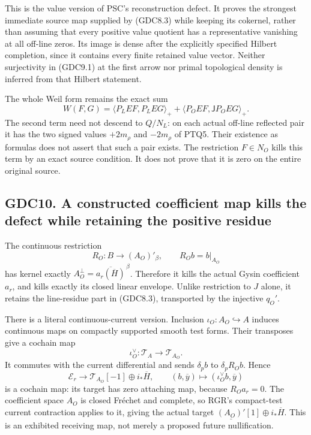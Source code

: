 This is the value version of PSC's reconstruction defect. It proves the
strongest immediate source map supplied by (GDC8.3) while keeping its
cokernel, rather than assuming that every positive value quotient has a
representative vanishing at all off-line zeros. Its image is dense after
the explicitly specified Hilbert completion, since it contains every
finite retained value vector. Neither surjectivity in (GDC9.1) at the
first arrow nor primal topological density is inferred from that Hilbert
statement.

The whole Weil form remains the exact sum \[
W(F,G)=\langle P_LEF,P_LEG\rangle_+
+\langle P_OEF,\mathsf JP_OEG\rangle_+.
\tag{GDC9.2}
\] The second term need not descend to \(Q/N_L\): on each actual
off-line reflected pair it has the two signed values \(+2m_\rho\) and
\(-2m_\rho\) of PTQ5. Their existence as formulas does not assert that
such a pair exists. The restriction \(F\in N_O\) kills this term by an
exact source condition. It does not prove that it is zero on the entire
original source.

\subsection{GDC10. A constructed coefficient map kills the defect while
retaining the positive
residue}\label{gdc10.-a-constructed-coefficient-map-kills-the-defect-while-retaining-the-positive-residue}

The continuous restriction \[
R_O:B\longrightarrow(A_O)'_\beta,
\qquad R_Ob=b|_{A_O}
\tag{GDC10.1}
\] has kernel exactly
\(A_O^\perp=\overline{a_r(\overline H)}^{\,\beta}\). Therefore it kills
the actual Gysin coefficient \(a_r\), and kills exactly its closed
linear envelope. Unlike restriction to \(J\) alone, it retains the
line-residue part in (GDC8.3), transported by the injective \(q_O'\).

There is a literal continuous-current version. Inclusion
\(\iota_O:A_O\hookrightarrow A\) induces continuous maps on compactly
supported smooth test forms. Their transposes give a cochain map \[
\iota_O^\vee:\mathscr T_A\longrightarrow\mathscr T_{A_O}.
\tag{GDC10.2}
\] It commutes with the current differential and sends \(\delta_pb\) to
\(\delta_p R_Ob\). Hence \[
\mathscr E_r\longrightarrow
\mathscr T_{A_O}[-1]\oplus i_*\overline H,
\qquad(b,\overline y)\longmapsto(\iota_O^\vee b,\overline y)
\tag{GDC10.3}
\] is a cochain map: its target has zero attaching map, because
\(R_Oa_r=0\). The coefficient space \(A_O\) is closed Fréchet and
complete, so RGR's compact-test current contraction applies to it,
giving the actual target \(\underline{(A_O)'}[1]\oplus i_*\overline H\).
This is an exhibited receiving map, not merely a proposed future
nullification.

